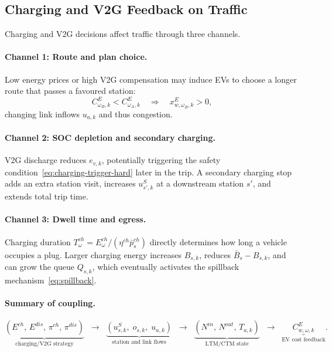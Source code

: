 \subsection{Charging and V2G Feedback on Traffic}
\label{sec:traffic-feedback}

Charging and V2G decisions affect traffic through three channels.

\paragraph{Channel 1: Route and plan choice.}
Low energy prices or high V2G compensation may induce EVs to choose
a longer route that passes a favoured station:
\begin{equation}
  C^E_{\omega_B,k} < C^E_{\omega_A,k}
  \quad\Rightarrow\quad
  x^E_{w,\omega_B,k} > 0,
  \label{eq:route-switching}
\end{equation}
changing link inflows $u_{a,k}$ and thus congestion.

\paragraph{Channel 2: SOC depletion and secondary charging.}
V2G discharge reduces $e_{v,k}$, potentially triggering the
safety condition~\eqref{eq:charging-trigger-hard} later in the trip.
A secondary charging stop adds an extra station visit, increases
$u^S_{s',k}$ at a downstream station $s'$, and extends total trip time.

\paragraph{Channel 3: Dwell time and egress.}
Charging duration $T^{ch}_\omega = E^{ch}_\omega / (\eta^{ch}\bar{p}^{ch}_s)$
directly determines how long a vehicle occupies a plug.  Larger charging
energy increases $B_{s,k}$, reduces $\bar{B}_s - B_{s,k}$, and can grow
the queue $Q_{s,k}$, which eventually activates the spillback
mechanism~\eqref{eq:spillback}.

\paragraph{Summary of coupling.}
\begin{equation}
  \underbrace{(E^{ch},\, E^{dis},\, \pi^{ch},\, \pi^{dis})}_{\text{charging/V2G strategy}}
  \;\;\longrightarrow\;\;
  \underbrace{(u^S_{s,k},\; o_{s,k},\; u_{a,k})}_{\text{station and link flows}}
  \;\;\longrightarrow\;\;
  \underbrace{(N^{in},\, N^{out},\, T_{a,k})}_{\text{LTM/CTM state}}
  \;\;\longrightarrow\;\;
  \underbrace{C^E_{w,\omega,k}}_{\text{EV cost feedback}}.
  \label{eq:feedback-chain}
\end{equation}

